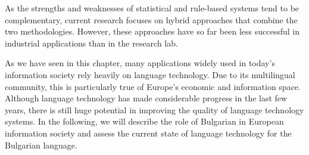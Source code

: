 \begin{multicols}{2}
As the strengths and weaknesses of statistical and rule-based systems tend to be complementary, current research focuses on hybrid approaches that combine the two methodologies. However, these approaches have so far been less successful in industrial applications than in the research lab. 

As we have seen in this chapter, many applications widely used in today’s information society rely heavily on language technology. Due to its multilingual community, this is particularly true of Europe’s economic and information space. Although language technology has made considerable progress in the last few years, there is still huge potential in improving the quality of language technology systems. In the following, we will describe the role of Bulgarian in European information society and assess the current state of language technology for the Bulgarian language. 

\end{multicols}

\clearpage


